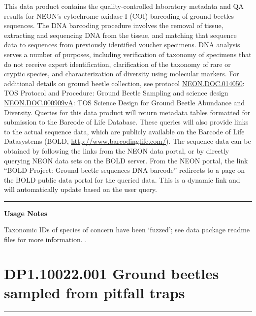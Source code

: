 \documentclass[]{article}
\begin{document}
This data product contains the quality-controlled laboratory metadata
and QA results for NEON's cytochrome oxidase I (COI) barcoding of ground
beetles sequences. The DNA barcoding procedure involves the removal of
tissue, extracting and sequencing DNA from the tissue, and matching that
sequence data to sequences from previously identified voucher specimens.
DNA analysis serves a number of purposes, including verification of
taxonomy of specimens that do not receive expert identification,
clarification of the taxonomy of rare or cryptic species, and
characterization of diversity using molecular markers. For additional
details on ground beetle collection, see protocol
\href{http://data.neonscience.org/api/v0/documents/NEON.DOC.014050vK}{NEON.DOC.014050}:
TOS Protocol and Procedure: Ground Beetle Sampling and science design
\href{http://data.neonscience.org/api/v0/documents/NEON.DOC.NEON.DOC.000909vA}{NEON.DOC.000909vA}:
TOS Science Design for Ground Beetle Abundance and Diversity. Queries
for this data product will return metadata tables formatted for
submission to the Barcode of Life Database. These queries will also
provide links to the actual sequence data, which are publicly available
on the Barcode of Life Datasystems (BOLD,
\url{http://www.barcodinglife.com/}). The sequence data can be obtained
by following the links from the NEON data portal, or by directly
querying NEON data sets on the BOLD server. From the NEON portal, the
link ``BOLD Project: Ground beetle sequences DNA barcode'' redirects to
a page on the BOLD public data portal for the queried data. This is a
dynamic link and will automatically update based on the user query.

\begin{center}\rule{0.5\linewidth}{\linethickness}\end{center}

\textbf{Usage Notes}

Taxonomic IDs of species of concern have been `fuzzed'; see data package
readme files for more information. \newpage
.

\section{DP1.10022.001 Ground beetles sampled from pitfall
traps}\label{dp1.10022.001-ground-beetles-sampled-from-pitfall-traps}

\begin{center}\rule{0.5\linewidth}{\linethickness}\end{center}
\end{document}
